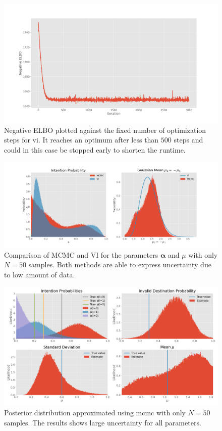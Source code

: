 \begin{figure}[h]
    \centering
    \includegraphics[width=\textwidth]{figures/example_vi_losses.png}
    \caption{Negative ELBO plotted against the fixed number of optimization steps for \acrshort{vi}. It reaches an optimum after less than $500$ steps and could in this case be stopped early to shorten the runtime.}
    \label{fig:example_vi_losses}
\end{figure}


\begin{figure}[h]
    \centering
    \includegraphics[width=\textwidth]{figures/example_vi_mcmc_comparison_low_N.png}
    \caption{Comparison of MCMC and VI for the parameters $\boldsymbol{\alpha}$ and $\mu$ with only $N=50$ samples. Both methods are able to express uncertainty due to low amount of data.}
    \label{fig:example_mcmc_vi_low_N}
\end{figure}

\begin{figure}[h]
    \centering
    \includegraphics[width=\textwidth]{figures/example_mcmc_low_N.png}
    \caption{Posterior distribution approximated using \acrshort{mcmc} with only $N=50$ samples. The results shows large uncertainty for all parameters.}
    \label{fig:example_mcmc_low_N}
\end{figure}


